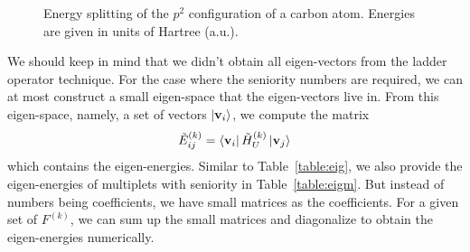 \begin{figure}[h!]
\begin{center}
\end{center}
\caption{Energy splitting of the $p^2$ configuration of a carbon atom.
Energies are given in units of Hartree (a.u.).}
\label{fig:p2split}
\end{figure}

We should keep in mind that we didn't obtain all eigen-vectors from the ladder operator
technique. For the case where the seniority numbers are required,
we can at most construct a small eigen-space that the eigen-vectors live in.
From this eigen-space, namely, a set of vectors $\Ket{\vec{v}_i}$, we compute
the matrix
\begin{equation}\label{eq:Ekij}
\tilde{E}_{ij}^{(k)} = \Bra{\vec{v}_i} \tilde{H}_U^{(k)} \Ket{\vec{v}_j}
\end{equation}
which contains the eigen-energies. Similar to Table~\ref{table:eig}, we also provide
the eigen-energies of multiplets with seniority in Table~\ref{table:eigm}.
But instead of numbers being coefficients, we have small matrices as the coefficients.
For a given set of $F^{(k)}$, we can sum up the small matrices and diagonalize
to obtain the eigen-energies numerically.

